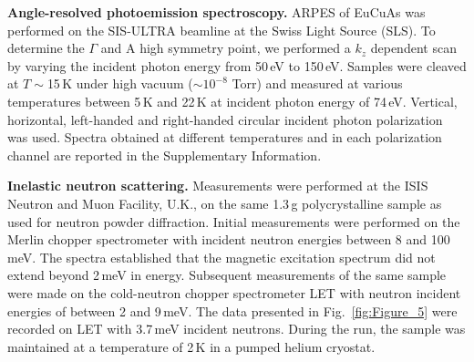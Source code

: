 \documentclass[aps,prl,amsmath,amssymb,amstext,citeautoscript,punctuation,nofootinbib,superscriptaddress,twocolumn]{revtex4-1}
\newcommand{\eca}{EuCuAs}
\begin{document}
\textbf{Angle-resolved photoemission spectroscopy.} ARPES of \eca{} was performed on the SIS-ULTRA beamline at the Swiss Light Source (SLS). To determine the $\Gamma$ and A high symmetry point, we performed a $k_z$ dependent scan by varying the incident photon energy from 50\,eV to 150\,eV. Samples were cleaved at $T\sim$15\,K under high vacuum ($\sim10^{-8}$ Torr) and measured at various temperatures between 5\,K and 22\,K at incident photon energy of 74\,eV.  Vertical, horizontal, left-handed and right-handed circular incident photon polarization was used. Spectra obtained at different temperatures and in each polarization channel are reported in the Supplementary Information.

\textbf{Inelastic neutron scattering.} Measurements were performed at the ISIS Neutron and Muon Facility, U.K., on the same 1.3\,g polycrystalline sample as used for neutron powder diffraction.  Initial measurements were performed on the Merlin chopper spectrometer with incident neutron energies between 8 and 100\,meV. The spectra established that the magnetic excitation spectrum did not extend beyond 2\,meV in energy. Subsequent measurements of the same sample were made on the cold-neutron chopper spectrometer LET with neutron incident energies of between 2 and 9\,meV. The data presented in Fig.~\ref{fig:Figure_5} were recorded on LET with 3.7\,meV incident neutrons. During the run, the sample was maintained at a temperature of 2\,K in a pumped helium cryostat.
\end{document}
